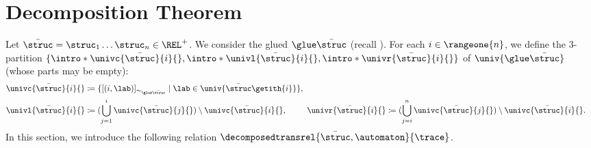 \documentclass[a4paper,UKenglish,cleveref, autoref, thm-restate]{lipics-v2021}
\DeclarePairedDelimiter\set{\{}{\}}
\DeclarePairedDelimiter\tuple{(}{)}
\newcommand{\defeq}{\coloneq}
\newcommand{\mul}[1]{\bar{#1}}
\begin{document}
\section{Decomposition Theorem}\label{section: decomposing derivatives}
Let $\mul{\struc} = \struc_1 \dots \struc_n \in \REL^{+}$.
We consider the glued  $\glue \mul{\struc}$ (recall ).
For each $i \in \rangeone{n}$, we define the $3$-partition $\set{\intro*\univc{\mul{\struc}}{i}{}, \intro*\univl{\mul{\struc}}{i}{}, \intro*\univr{\mul{\struc}}{i}{}}$ of $\univ{\glue \mul{\struc}}$ (whose parts may be empty):
\begin{align*}
\univc{\mul{\struc}}{i}{} &\defeq \set{[\tuple{i, \lab}]_{\sim_{\glue \mul{\struc}}} \mid \lab \in \univ{\mul{\struc}\getith{i}}},\\ 
\univl{\mul{\struc}}{i}{} &\defeq (\bigcup_{j = 1}^{i} \univc{\mul{\struc}}{j}{}) \setminus \univc{\mul{\struc}}{i}{},& \hspace{-.5em} 
\univr{\mul{\struc}}{i}{} &\defeq (\bigcup_{j = i}^{n} \univc{\mul{\struc}}{j}{}) \setminus \univc{\mul{\struc}}{i}{}.
\end{align*}
In this section, we introduce the following relation $\decomposedtransrel{\mul{\struc}, \automaton}{\trace}$.
\end{document}
